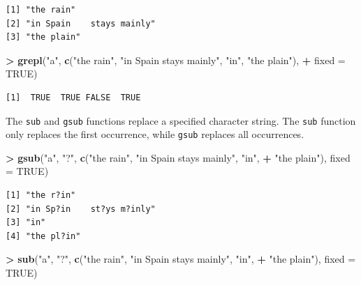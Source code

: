\documentclass[]{krantz}
\makeatletter
\newenvironment{Shaded}{\begin{snugshade}}{\end{snugshade}}
\newcommand{\KeywordTok}[1]{\textcolor[rgb]{0.27,0.27,0.27}{\textbf{#1}}}
\newcommand{\DataTypeTok}[1]{\textcolor[rgb]{0.27,0.27,0.27}{#1}}
\newcommand{\StringTok}[1]{\textcolor[rgb]{0.5,0.5,0.5}{#1}}
\newcommand{\OtherTok}[1]{\textcolor[rgb]{0.37,0.37,0.37}{#1}}
\newcommand{\OperatorTok}[1]{\textcolor[rgb]{0.43,0.43,0.43}{\textbf{#1}}}
\newcommand{\NormalTok}[1]{#1}
\newenvironment{kframe}{%
\medskip{}
\setlength{\fboxsep}{.8em}
 \def\at@end@of@kframe{}%
 \ifinner\ifhmode%
  \def\at@end@of@kframe{\end{minipage}}%
  \begin{minipage}{\columnwidth}%
 \fi\fi%
 \def\FrameCommand##1{\hskip\@totalleftmargin \hskip-\fboxsep
 \colorbox{shadecolor}{##1}\hskip-\fboxsep
     \hskip-\linewidth \hskip-\@totalleftmargin \hskip\columnwidth}%
 \MakeFramed {\advance\hsize-\width
   \@totalleftmargin\z@ \linewidth\hsize
   \@setminipage}}%
 {\par\unskip\endMakeFramed%
 \at@end@of@kframe}
\renewenvironment{Shaded}{\begin{kframe}}{\end{kframe}}
\makeatother
\begin{document}
\begin{verbatim}
[1] "the rain"                
[2] "in Spain    stays mainly"
[3] "the plain"               
\end{verbatim}

\begin{Shaded}
\begin{Highlighting}[]
\OperatorTok{>}\StringTok{ }\KeywordTok{grepl}\NormalTok{(}\StringTok{"a"}\NormalTok{, }\KeywordTok{c}\NormalTok{(}\StringTok{"the rain"}\NormalTok{, }\StringTok{"in Spain    stays mainly"}\NormalTok{, }\StringTok{"in"}\NormalTok{, }\StringTok{"the plain"}\NormalTok{), }
\OperatorTok{+}\StringTok{       }\DataTypeTok{fixed =} \OtherTok{TRUE}\NormalTok{)}
\end{Highlighting}
\end{Shaded}

\begin{verbatim}
[1]  TRUE  TRUE FALSE  TRUE
\end{verbatim}

The \texttt{sub} and \texttt{gsub} functions replace a specified
character string. The \texttt{sub} function only replaces the first
occurrence, while \texttt{gsub} replaces all occurrences.

\begin{Shaded}
\begin{Highlighting}[]
\OperatorTok{>}\StringTok{ }\KeywordTok{gsub}\NormalTok{(}\StringTok{"a"}\NormalTok{, }\StringTok{"?"}\NormalTok{, }\KeywordTok{c}\NormalTok{(}\StringTok{"the rain"}\NormalTok{, }\StringTok{"in Spain    stays mainly"}\NormalTok{, }\StringTok{"in"}\NormalTok{, }
\OperatorTok{+}\StringTok{                  "the plain"}\NormalTok{), }\DataTypeTok{fixed =} \OtherTok{TRUE}\NormalTok{)}
\end{Highlighting}
\end{Shaded}

\begin{verbatim}
[1] "the r?in"                
[2] "in Sp?in    st?ys m?inly"
[3] "in"                      
[4] "the pl?in"               
\end{verbatim}

\begin{Shaded}
\begin{Highlighting}[]
\OperatorTok{>}\StringTok{ }\KeywordTok{sub}\NormalTok{(}\StringTok{"a"}\NormalTok{, }\StringTok{"?"}\NormalTok{, }\KeywordTok{c}\NormalTok{(}\StringTok{"the rain"}\NormalTok{, }\StringTok{"in Spain    stays mainly"}\NormalTok{, }\StringTok{"in"}\NormalTok{, }
\OperatorTok{+}\StringTok{                 "the plain"}\NormalTok{), }\DataTypeTok{fixed =} \OtherTok{TRUE}\NormalTok{)}
\end{Highlighting}
\end{Shaded}
\end{document}
